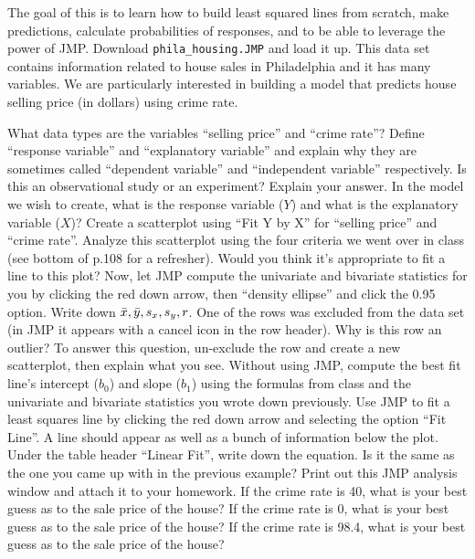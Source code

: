 \documentclass[12pt]{article}
\begin{document}
\problem The goal of this is to learn how to build least squared lines from scratch, make predictions, calculate probabilities of responses, and to be able to leverage the power of JMP. Download \texttt{phila\_housing.JMP} and load it up. This data set contains information related to house sales in Philadelphia and it has many variables. We are particularly interested in building a model that predicts house selling price (in dollars) using crime rate.

\benum
\easysubproblem What data types are the variables ``selling price'' and ``crime rate''?
\easysubproblem Define ``response variable'' and ``explanatory variable'' and explain why they are sometimes called ``dependent variable'' and ``independent variable'' respectively.
\easysubproblem Is this an observational study or an experiment? Explain your answer.
\easysubproblem In the model we wish to create, what is the response variable ($Y$) and what is the explanatory variable ($X$)?
\easysubproblem Create a scatterplot using ``Fit Y by X'' for ``selling price'' and ``crime rate''. Analyze this scatterplot using the four criteria we went over in class (see bottom of p.108 for a refresher).
\easysubproblem Would you think it's appropriate to fit a line to this plot?
\easysubproblem Now, let JMP compute the univariate and bivariate statistics for you by clicking the red down arrow, then ``density ellipse'' and click the 0.95 option. Write down $\bar{x}, \bar{y}, s_x, s_y, r$.
\easysubproblem One of the rows was excluded from the data set (in JMP it appears with a cancel icon in the row header). Why is this row an outlier? To answer this question, un-exclude the row and create a new scatterplot, then explain what you see.
\easysubproblem Without using JMP, compute the best fit line's intercept ($b_0$) and slope ($b_1$) using the formulas from class and the univariate and bivariate statistics you wrote down previously.
\easysubproblem Use JMP to fit a least squares line by clicking the red down arrow and selecting the option ``Fit Line''. A line should appear as well as a bunch of information below the plot. Under the table header ``Linear Fit'', write down the equation. Is it the same as the one you came up with in the previous example? Print out this JMP analysis window and attach it to your homework.
\easysubproblem If the crime rate is 40, what is your best guess as to the sale price of the house?
\easysubproblem If the crime rate is 0, what is your best guess as to the sale price of the house?
\easysubproblem If the crime rate is 98.4, what is your best guess as to the sale price of the house?
\end{document}
